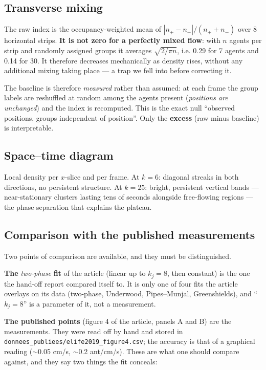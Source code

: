 \documentclass[11pt,a4paper]{article}
\newcommand{\code}[1]{\texttt{#1}}
\begin{document}
\subsection{Transverse mixing}

The raw index is the occupancy-weighted mean of $|n_+-n_-|/(n_++n_-)$ over 8
horizontal strips. \textbf{It is not zero for a perfectly mixed flow}: with $n$
agents per strip and randomly assigned groups it averages $\sqrt{2/\pi n}$, i.e.
0.29 for 7 agents and 0.14 for 30. It therefore decreases mechanically as
density rises, without any additional mixing taking place --- a trap we fell
into before correcting it.

The baseline is therefore \emph{measured} rather than assumed: at each frame the
group labels are reshuffled at random among the agents present (\emph{positions
are unchanged}) and the index is recomputed. This is the exact null ``observed
positions, groups independent of position''. Only the \textbf{excess} (raw minus
baseline) is interpretable.

\subsection{Space--time diagram}

Local density per $x$-slice and per frame. At $k=6$: diagonal streaks in both
directions, no persistent structure. At $k=25$: bright, persistent vertical
bands --- near-stationary clusters lasting tens of seconds alongside free-flowing
regions --- the phase separation that explains the plateau.

\subsection{Comparison with the published measurements}\label{sec:elife}

Two points of comparison are available, and they must be distinguished.

\textbf{The} \emph{two-phase} \textbf{fit} of the article (linear up to
$k_j=8$, then constant) is the one the hand-off report compared itself to. It is
only one of four fits the article overlays on its data (two-phase, Underwood,
Pipes--Munjal, Greenshields), and ``$k_j=8$'' is a parameter of it, not a
measurement.

\textbf{The published points} (figure 4 of the article, panels A and B) are the
measurements. They were read off by hand and stored in
\code{donnees\_publiees/elife2019\_figure4.csv}; the accuracy is that of a
graphical reading ($\sim$0.05 cm/s, $\sim$0.2 ant/cm/s). These are what one
should compare against, and they say two things the fit conceals:
\end{document}
